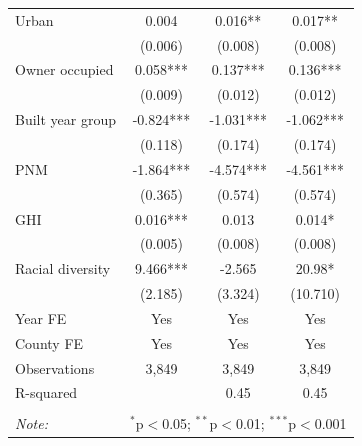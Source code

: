 \documentclass[12pt,twoside,letterpaper]{article}
\begin{document}
\begin{table}[H]
{\begin{tabular}{lccc}
Urban & 0.004 & 0.016** & 0.017** \\
 & (0.006) & (0.008) & (0.008) \\
Owner occupied & 0.058*** & 0.137*** & 0.136*** \\
 & (0.009) & (0.012) & (0.012) \\
Built year group & -0.824*** & -1.031*** & -1.062*** \\
 & (0.118) & (0.174) & (0.174) \\
PNM & -1.864*** & -4.574*** & -4.561*** \\
 & (0.365) & (0.574) & (0.574) \\
GHI & 0.016*** & 0.013 & 0.014* \\
 & (0.005) & (0.008) & (0.008) \\
Racial diversity & 9.466*** & -2.565 & 20.98* \\
 & (2.185) & (3.324) & (10.710) \\ \cline{1-4}
Year FE & Yes & Yes & Yes  \\
County FE & Yes & Yes & Yes  \\
Observations & 3,849 & 3,849 & 3,849  \\
\multicolumn{2}{l}{R-squared} & 0.45 & 0.45  \\
\hline
\hline \\[-1.8ex]
\textit{Note:} & \multicolumn{3}{r}{$^{*}$p$<$0.05; $^{**}$p$<$0.01; $^{***}$p$<$0.001} \\
\end{tabular}}
\end{table}
\end{document}
